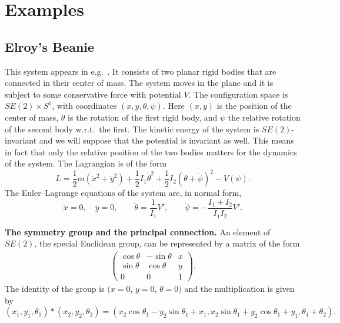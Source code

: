 \documentclass[pdftex]{sigma}
\begin{document}
\section{Examples}\label{section7}
\subsection{Elroy's Beanie}\label{section7.1}
This system appears in e.g.~\cite{marsdenphases}. It consists of two planar rigid bodies that
are connected in their center of mass. The system moves in the plane
and it is subject to some conservative force with potential $V$. The
conf\/iguration space is $SE(2)\times S^1$, with coordinates $(x,y,\theta,\psi)$. Here $(x,y)$ is the position of the center of
mass, $\theta$ is the rotation of the f\/irst rigid body, and $\psi$
the relative rotation of the second body w.r.t.\ the f\/irst. The
kinetic energy of the system is $SE(2)$-invariant and we will
suppose that the potential is invariant as well. This means in fact that only the
relative position of the two bodies matters for the dynamics of the
system. The Lagrangian is of the form
\[
L=\frac12 m ({\dot x}^2 + {\dot y}^2) + \frac12 I_1 {\dot\theta}^2 +
\frac12 I_2 (\dot\theta+\dot\psi)^2 -V(\psi).
\]
The Euler--Lagrange equations of the system are, in normal form,
\[
\ddot x =0, \quad \ddot y=0, \qquad \ddot\theta = \frac{1}{I_1} V',
\qquad \ddot\psi = - \frac{I_1+I_2}{I_1I_2} V'.
\]


{\bf The symmetry group and the principal connection.}
An element of $SE(2)$, the special Euclidean group, can be represented
by a matrix of the form
\begin{gather} \label{euclmatrix}
\left( \begin{array}{ccc} \cos\theta & -\sin\theta & x \\
\sin\theta &\cos\theta & y \\ 0&0&1 \end{array}\right).
\end{gather}
The identity of the group is $(x=0$, $y=0$, $\theta=0)$ and the
multiplication is given by
\[
(x_1,y_1,\theta_1) * (x_2,y_2,\theta_2) =
(x_2\cos\theta_1-y_2\sin\theta_1 + x_1,
x_2\sin\theta_1+y_2\cos\theta_1 + y_1, \theta_1+\theta_2).
\]
\end{document}
